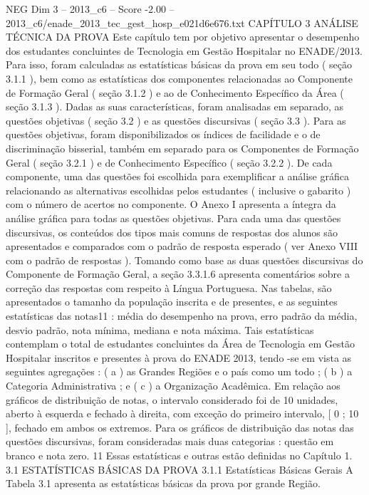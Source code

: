 \begin{textsample}{NEG Dim 3 – 2013\_c6 – Score -2.00 – 2013\_c6/enade\_2013\_tec\_gest\_hosp\_e021d6e676.txt}  \label{ex:f3_neg_052}
CAPÍTULO 3 ANÁLISE TÉCNICA DA PROVA Este capítulo tem por objetivo apresentar o desempenho dos estudantes concluintes de Tecnologia em Gestão Hospitalar no ENADE/2013.
Para isso, foram calculadas as estatísticas básicas da prova em seu todo ( seção 3.1.1 ), bem como as estatísticas dos componentes relacionadas ao Componente de Formação Geral ( seção 3.1.2 ) e ao de Conhecimento Específico da Área ( seção 3.1.3 ).
Dadas as suas características, foram analisadas em separado, as questões objetivas ( seção 3.2 ) e as questões discursivas ( seção 3.3 ).
Para as questões objetivas, foram disponibilizados os índices de facilidade e o de discriminação bisserial, também em separado para os Componentes de Formação Geral ( seção 3.2.1 ) e de Conhecimento Específico ( seção 3.2.2 ).
De cada componente, uma das questões foi escolhida para exemplificar a análise gráfica relacionando as alternativas escolhidas pelos estudantes ( inclusive o gabarito ) com o número de acertos no componente.
O Anexo I apresenta a íntegra da análise gráfica para todas as questões objetivas.
Para cada uma das questões discursivas, os conteúdos dos tipos mais comuns de respostas dos alunos são apresentados e comparados com o padrão de resposta esperado ( ver Anexo VIII com o padrão de respostas ).
Tomando como base as duas questões discursivas do Componente de Formação Geral, a seção 3.3.1.6 apresenta comentários sobre a correção das respostas com respeito à Língua Portuguesa.
Nas tabelas, são apresentados o tamanho da população inscrita e de presentes, e as seguintes estatísticas das notas11 : média do desempenho na prova, erro padrão da média, desvio padrão, nota mínima, mediana e nota máxima.
Tais estatísticas contemplam o total de estudantes concluintes da Área de Tecnologia em Gestão Hospitalar inscritos e presentes à prova do ENADE 2013, tendo -se em vista as seguintes agregações : ( a ) as Grandes Regiões e o país como um todo ; ( b ) a Categoria Administrativa ; e ( c ) a Organização Acadêmica.
Em relação aos gráficos de distribuição de notas, o intervalo considerado foi de 10 unidades, aberto à esquerda e fechado à direita, com exceção do primeiro intervalo, [ 0 ; 10 ], fechado em ambos os extremos.
Para os gráficos de distribuição das notas das questões discursivas, foram consideradas mais duas categorias : questão em branco e nota zero. 11 Essas estatísticas e outras estão definidas no Capítulo 1. 3.1 ESTATÍSTICAS BÁSICAS DA PROVA 3.1.1 Estatísticas Básicas Gerais A Tabela 3.1 apresenta as estatísticas básicas da prova por grande Região.

\end{textsample}
